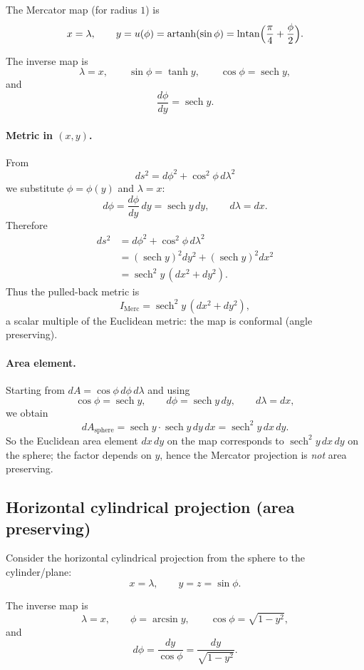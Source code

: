 \documentclass[12pt,a4paper]{article}
\theoremstyle{plain}
\theoremstyle{definition}      %
\begin{document}
The Mercator map (for radius $1$) is
\[
x = \lambda,\qquad
y = u(\phi) = \operatorname{artanh}(\sin\phi)
= \ln\!\tan\Bigl(\frac{\pi}{4}+\frac{\phi}{2}\Bigr).
\]

The inverse map is
\[
\lambda = x,\qquad
\sin\phi = \tanh y,\qquad
\cos\phi = \operatorname{sech}y,
\]
and
\[
\frac{d\phi}{dy} = \operatorname{sech}y.
\]

\paragraph{Metric in $(x,y)$.}
From
\[
ds^{2} = d\phi^{2} + \cos^{2}\phi\,d\lambda^{2}
\]
we substitute $\phi=\phi(y)$ and $\lambda=x$:
\[
d\phi = \frac{d\phi}{dy}\,dy = \operatorname{sech}y\,dy,
\qquad
d\lambda = dx.
\]
Therefore
\[
\begin{aligned}
	ds^{2}
	&= d\phi^{2} + \cos^{2}\phi\,d\lambda^{2} \\
	&= (\operatorname{sech}y)^{2}dy^{2}
	+ (\operatorname{sech}y)^{2}dx^{2} \\
	&= \operatorname{sech}^{2}y\,(dx^{2}+dy^{2}).
\end{aligned}
\]
Thus the pulled-back metric is
\[
I_{\text{Merc}} = \operatorname{sech}^{2}y\,(dx^{2}+dy^{2}),
\]
a scalar multiple of the Euclidean metric: the map is conformal (angle preserving).

\paragraph{Area element.}
Starting from $dA = \cos\phi\,d\phi\,d\lambda$ and using
\[
\cos\phi = \operatorname{sech}y,\qquad
d\phi = \operatorname{sech}y\,dy,\qquad
d\lambda = dx,
\]
we obtain
\[
dA_{\text{sphere}}
= \operatorname{sech}y\cdot\operatorname{sech}y\,dy\,dx
= \operatorname{sech}^{2}y\,dx\,dy.
\]
So the Euclidean area element $dx\,dy$ on the map corresponds to
$\operatorname{sech}^{2}y\,dx\,dy$ on the sphere; the factor depends on $y$,
hence the Mercator projection is \emph{not} area preserving.

\subsection*{Horizontal cylindrical projection (area preserving)}

Consider the horizontal cylindrical projection from the sphere to the
cylinder/plane:
\[
x = \lambda,\qquad y = z = \sin\phi.
\]

The inverse map is
\[
\lambda = x,\qquad
\phi = \arcsin y,\qquad
\cos\phi = \sqrt{1-y^{2}},
\]
and
\[
d\phi = \frac{dy}{\cos\phi}
= \frac{dy}{\sqrt{1-y^{2}}}.
\]
\end{document}
